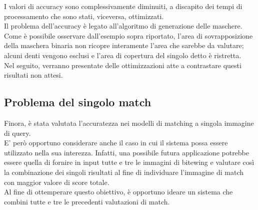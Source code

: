 \documentclass[12pt,a4paper,openright,twoside]{book}
\begin{document}
I valori di accuracy sono complessivamente diminuiti, a discapito dei tempi di processamento che sono stati, viceversa, ottimizzati.\\
Il problema dell'accuracy è legato all'algoritmo di generazione delle maschere. Come è possibile osservare dall'esempio sopra riportato, l'area di sovrapposizione della maschera binaria non ricopre interamente l'area che sarebbe da valutare; alcuni denti vengono esclusi e l'area di copertura del singolo detto è ristretta.\\
Nel seguito, verranno presentate delle ottimizzazioni atte a contrastare questi risultati non attesi.

\subsection{Problema del singolo match}
Finora, è stata valutata l'accuratezza nei modelli di matching a singola immagine di query. \\
E' però opportuno considerare anche il caso in cui il sistema possa essere utilizzato nella sua interezza. Infatti, una possibile futura applicazione potrebbe essere quella di fornire in input tutte e tre le immagini di bitewing e valutare così la combinazione dei singoli risultati al fine di individuare l'immagine di match con maggior valore di score totale.\\
Al fine di ottemperare questo obiettivo, è opportuno ideare un sistema che combini tutte e tre le precedenti valutazioni di match.

\end{document}

